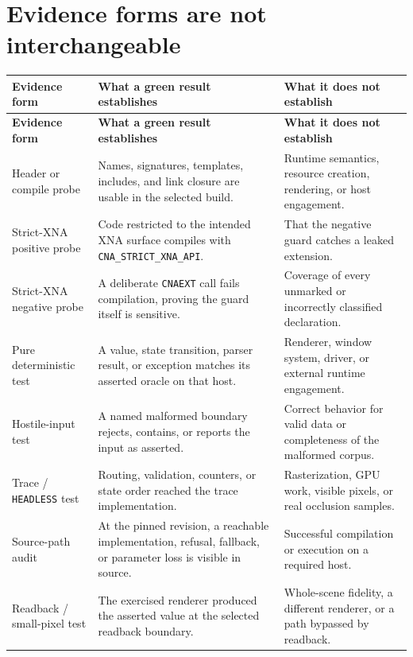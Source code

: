 \section{Evidence forms are not interchangeable}

\begin{small}
\begin{longtable}{>{\raggedright\arraybackslash}p{2.45cm}>{\raggedright\arraybackslash}p{4.15cm}>{\raggedright\arraybackslash}p{4.3cm}}
\toprule
\textbf{Evidence form} & \textbf{What a green result establishes} & \textbf{What it does not establish} \\
\midrule
\endfirsthead
\toprule
\textbf{Evidence form} & \textbf{What a green result establishes} & \textbf{What it does not establish} \\
\midrule
\endhead
Header or compile probe & Names, signatures, templates, includes, and link closure are usable in
  the selected build. & Runtime semantics, resource creation, rendering, or host engagement. \\
Strict-XNA positive probe & Code restricted to the intended XNA surface compiles with
  \texttt{CNA\_STRICT\_XNA\_API}. & That the negative guard catches a leaked extension. \\
Strict-XNA negative probe & A deliberate \texttt{CNAEXT} call fails compilation, proving the
  guard itself is sensitive. & Coverage of every unmarked or incorrectly classified declaration. \\
Pure deterministic test & A value, state transition, parser result, or exception matches its
  asserted oracle on that host. & Renderer, window system, driver, or external runtime engagement. \\
Hostile-input test & A named malformed boundary rejects, contains, or reports the input as
  asserted. & Correct behavior for valid data or completeness of the malformed corpus. \\
Trace / \texttt{HEADLESS} test & Routing, validation, counters, or state order reached the trace
  implementation. & Rasterization, GPU work, visible pixels, or real occlusion samples. \\
Source-path audit & At the pinned revision, a reachable implementation, refusal, fallback, or
  parameter loss is visible in source. & Successful compilation or execution on a required host. \\
Readback / small-pixel test & The exercised renderer produced the asserted value at the selected
  readback boundary. & Whole-scene fidelity, a different renderer, or a path bypassed by readback. \\

\end{longtable}
\end{small}
